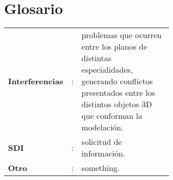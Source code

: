 \chapter*{Glosario}


\begin{table}[H]
\begin{tabular}{l c p{0.65\linewidth}}
    \textbf{Interferencias} &:& problemas que ocurren entre los planos de distintas especialidades, generando conflictos presentados entre los distintos objetos 3D que conforman la modelación. \\

    \textbf{SDI}            &:& solicitud de información.\\

    \textbf{Otro}           &:& something.
\end{tabular}  
\end{table}
